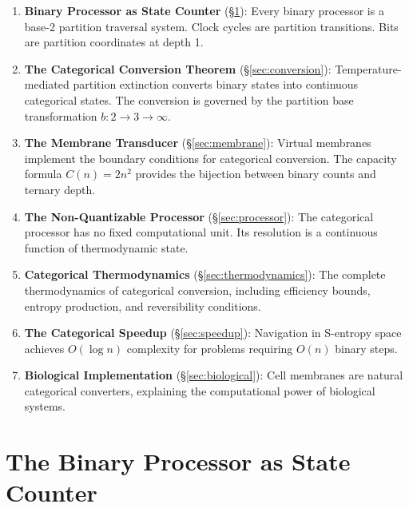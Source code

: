 \documentclass[twocolumn,10pt]{article}
\theoremstyle{remark}
\begin{document}
\begin{enumerate}
    \item \textbf{Binary Processor as State Counter} (\S\ref{sec:binary}): Every binary processor is a base-2 partition traversal system. Clock cycles are partition transitions. Bits are partition coordinates at depth 1.

    \item \textbf{The Categorical Conversion Theorem} (\S\ref{sec:conversion}): Temperature-mediated partition extinction converts binary states into continuous categorical states. The conversion is governed by the partition base transformation $b: 2 \to 3 \to \infty$.

    \item \textbf{The Membrane Transducer} (\S\ref{sec:membrane}): Virtual membranes implement the boundary conditions for categorical conversion. The capacity formula $C(n) = 2n^2$ provides the bijection between binary counts and ternary depth.

    \item \textbf{The Non-Quantizable Processor} (\S\ref{sec:processor}): The categorical processor has no fixed computational unit. Its resolution is a continuous function of thermodynamic state.

    \item \textbf{Categorical Thermodynamics} (\S\ref{sec:thermodynamics}): The complete thermodynamics of categorical conversion, including efficiency bounds, entropy production, and reversibility conditions.

    \item \textbf{The Categorical Speedup} (\S\ref{sec:speedup}): Navigation in S-entropy space achieves $O(\log n)$ complexity for problems requiring $O(n)$ binary steps.

    \item \textbf{Biological Implementation} (\S\ref{sec:biological}): Cell membranes are natural categorical converters, explaining the computational power of biological systems.
\end{enumerate}

\section{The Binary Processor as State Counter}
\label{sec:binary}
\end{document}
